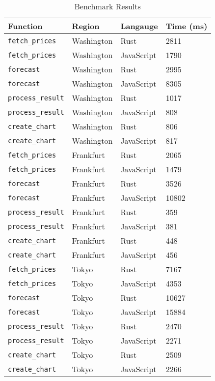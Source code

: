 \begin{table}[h]
  \centering
  \begin{tabular}{|l|l|l|l|}
    \hline
    Function          & Region     & Langauge   & Time (ms) \\ \hline
    \texttt{fetch\_prices}   & Washington & Rust       & 2811      \\ \hline
    \texttt{fetch\_prices}   & Washington & JavaScript & 1790      \\ \hline
    \texttt{forecast}        & Washington & Rust       & 2995      \\ \hline
    \texttt{forecast}        & Washington & JavaScript & 8305      \\ \hline
    \texttt{process\_result} & Washington & Rust       & 1017      \\ \hline
    \texttt{process\_result} & Washington & JavaScript & 808       \\ \hline
    \texttt{create\_chart}   & Washington & Rust       & 806       \\ \hline
    \texttt{create\_chart}   & Washington & JavaScript & 817       \\ \hline
    \texttt{fetch\_prices}   & Frankfurt & Rust       & 2065       \\ \hline
    \texttt{fetch\_prices}   & Frankfurt & JavaScript & 1479       \\ \hline
    \texttt{forecast}        & Frankfurt & Rust       & 3526       \\ \hline
    \texttt{forecast}        & Frankfurt & JavaScript & 10802      \\ \hline
    \texttt{process\_result} & Frankfurt & Rust       & 359        \\ \hline
    \texttt{process\_result} & Frankfurt & JavaScript & 381        \\ \hline
    \texttt{create\_chart}   & Frankfurt & Rust       & 448        \\ \hline
    \texttt{create\_chart}   & Frankfurt & JavaScript & 456        \\ \hline
    \texttt{fetch\_prices}   & Tokyo     & Rust       & 7167       \\ \hline
    \texttt{fetch\_prices}   & Tokyo     & JavaScript & 4353       \\ \hline
    \texttt{forecast}        & Tokyo     & Rust       & 10627      \\ \hline
    \texttt{forecast}        & Tokyo     & JavaScript & 15884      \\ \hline
    \texttt{process\_result} & Tokyo     & Rust       & 2470       \\ \hline
    \texttt{process\_result} & Tokyo     & JavaScript & 2271       \\ \hline
    \texttt{create\_chart}   & Tokyo     & Rust       & 2509       \\ \hline
    \texttt{create\_chart}   & Tokyo     & JavaScript & 2266       \\ \hline
  \end{tabular}
  \caption{Benchmark Results}
  \label{tab:benchmark}
\end{table}

